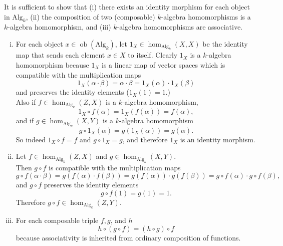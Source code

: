 \documentclass{article}
\newenvironment{problem}[2][Problem]{\begin{trivlist}
\item[\hskip \labelsep {\bfseries #1}\hskip \labelsep {\bfseries #2.}]}{\end{trivlist}}
\newenvironment{problempart}[1]{\begin{trivlist}\item[\textbf{Part #1.}]}{\end{trivlist}}
\begin{document}
\begin{problem}{7} $ $\\
  \begin{problempart}{(a)}
    It is sufficient to show that
    (i) there exists an identity morphism for each object in $\text{Alg}_k$,
    (ii) the composition of two (composable) $k$-algebra homomorphisms is a
      $k$-algebra homomorphism, and
    (iii) $k$-algebra homomorphisms are associative.
    \begin{enumerate}[(i)]
      \item For each object $x\in\operatorname{ob}(\text{Alg}_k)$, let
        $1_X \in \operatorname{hom}_{\text{Alg}_k}(X,X)$ be the
        identity map that sends each element $x \in X$ to itself.
        Clearly $1_X$ is a $k$-algebra homomorphism because $1_X$ is a linear map
        of vector spaces which is compatible with the multiplication maps \[
          1_X(\alpha \cdot \beta) = \alpha \cdot \beta
          = 1_X(\alpha) \cdot 1_X(\beta)
        \] and preserves the identity elements ($1_X(1) = 1.$)\\
        Also if $f \in \operatorname{hom}_{\text{Alg}_k}(Z,X)$ is a $k$-algebra
        homomorphism, \[
          1_X \circ f(\alpha) = 1_X(f(\alpha)) = f(\alpha),
        \] and if $g \in \operatorname{hom}_{\text{Alg}_k}(X,Y)$ is a $k$-algebra
        homomorphism \[
          g\circ 1_X(\alpha) = g(1_X(\alpha)) = g(\alpha).
        \] So indeed $1_X \circ f = f$ and $g \circ 1_X = g$, and therefore $1_X$
        is an identity morphism.
      \item Let
        $f \in \operatorname{hom}_{\text{Alg}_k}(Z,X)$ and
        $g \in \operatorname{hom}_{\text{Alg}_k}(X,Y)$.\\
        Then $g \circ f$ is compatible with the multiplication maps \[
          g \circ f(\alpha \cdot \beta) = g(f(\alpha) \cdot f(\beta))
          = g(f(\alpha)) \cdot g(f(\beta))
          = g\circ f(\alpha) \cdot g\circ f(\beta),
        \] and $g \circ f$ preserves the identity elements \[
          g\circ f(1) = g(1) = 1.
        \] Therefore $g \circ f \in \operatorname{hom}_{\text{Alg}_k}(Z,Y)$.
      \item For each composable triple $f, g$, and $h$ \[
      h \circ (g \circ f) = (h \circ g) \circ f
      \] because associativity is inherited from ordinary composition of functions.
    \end{enumerate}
  \end{problempart}
  \begin{problempart}{(b)}

\end{problempart}
\end{problem}
\end{document}
